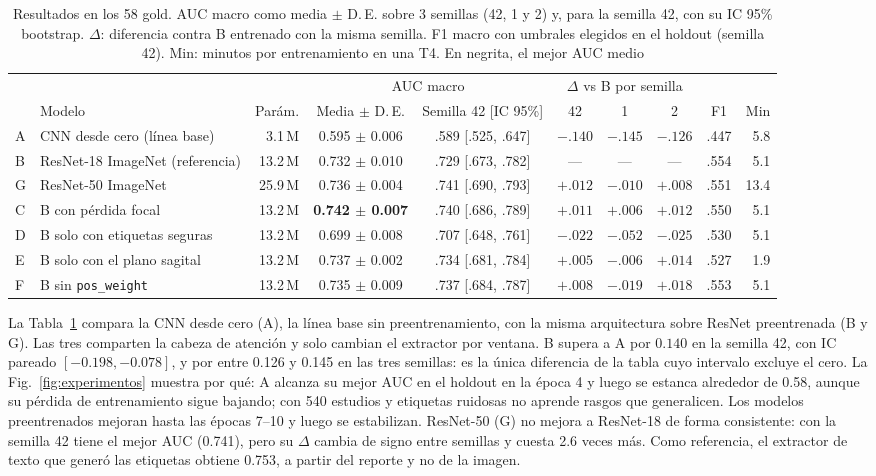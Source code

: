 \documentclass[conference]{IEEEtran}
\begin{document}
\begin{table}[t]
  \caption{Resultados en los 58 gold. AUC macro como media $\pm$ D.\,E. sobre 3 semillas (42, 1 y 2) y, para la semilla 42, con su IC 95\% bootstrap.
    $\Delta$: diferencia contra B entrenado con la misma semilla. F1 macro con umbrales elegidos en el holdout (semilla 42). Min: minutos por entrenamiento en una T4.
    En negrita, el mejor AUC medio}
  \label{tab:resultados}
  \centering
  \footnotesize
  \begin{tabular}{@{}llrccccccr@{}}
    \toprule
    & & & \multicolumn{2}{c}{AUC macro} & \multicolumn{3}{c}{$\Delta$ vs B por semilla} & & \\
    \cmidrule(lr){4-5} \cmidrule(lr){6-8}
    & Modelo & Parám. & Media $\pm$ D.\,E. & Semilla 42 [IC 95\%] & 42 & 1 & 2 & F1 & Min \\
    \midrule
    A & CNN desde cero (línea base)  &  3.1\,M & 0.595 $\pm$ 0.006 & .589 [.525, .647] & $-.140$ & $-.145$ & $-.126$ & .447 &  5.8 \\
    B & ResNet-18 ImageNet (referencia) & 13.2\,M & 0.732 $\pm$ 0.010 & .729 [.673, .782] & --- & --- & --- & .554 & 5.1 \\
    G & ResNet-50 ImageNet           & 25.9\,M & 0.736 $\pm$ 0.004 & .741 [.690, .793] & $+.012$ & $-.010$ & $+.008$ & .551 & 13.4 \\
    \midrule
    C & B con pérdida focal          & 13.2\,M & \textbf{0.742 $\pm$ 0.007} & .740 [.686, .789] & $+.011$ & $+.006$ & $+.012$ & .550 & 5.1 \\
    D & B solo con etiquetas seguras & 13.2\,M & 0.699 $\pm$ 0.008 & .707 [.648, .761] & $-.022$ & $-.052$ & $-.025$ & .530 & 5.1 \\
    E & B solo con el plano sagital  & 13.2\,M & 0.737 $\pm$ 0.002 & .734 [.681, .784] & $+.005$ & $-.006$ & $+.014$ & .527 & 1.9 \\
    F & B sin \texttt{pos\_weight}   & 13.2\,M & 0.735 $\pm$ 0.009 & .737 [.684, .787] & $+.008$ & $-.019$ & $+.018$ & .553 & 5.1 \\
    \bottomrule
  \end{tabular}
\end{table}

La Tabla~\ref{tab:resultados} compara la CNN desde cero (A), la línea base sin preentrenamiento, con la misma arquitectura sobre ResNet preentrenada (B y G).
Las tres comparten la cabeza de atención y solo cambian el extractor por ventana.
B supera a A por $0.140$ en la semilla 42, con IC pareado $[-0.198, -0.078]$, y por entre 0.126 y 0.145 en las tres semillas: es la única diferencia de la tabla cuyo intervalo excluye el cero.
La Fig.~\ref{fig:experimentos} muestra por qué: A alcanza su mejor AUC en el holdout en la época 4 y luego se estanca alrededor de 0.58, aunque su pérdida de entrenamiento sigue bajando; con 540 estudios y etiquetas ruidosas no aprende rasgos que generalicen.
Los modelos preentrenados mejoran hasta las épocas 7--10 y luego se estabilizan.
ResNet-50 (G) no mejora a ResNet-18 de forma consistente: con la semilla 42 tiene el mejor AUC (0.741), pero su $\Delta$ cambia de signo entre semillas y cuesta 2.6 veces más.
Como referencia, el extractor de texto que generó las etiquetas obtiene 0.753, a partir del reporte y no de la imagen.
\end{document}
